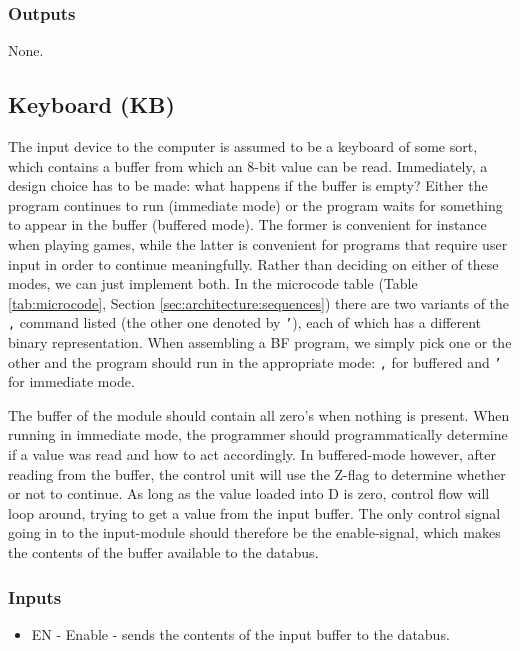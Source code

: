 \subsubsection*{Outputs}
None.


\subsection{Keyboard (KB)} \label{sec:architecture:kb}
The input device to the computer is assumed to be a keyboard of some sort, which contains a buffer from which an 8-bit value can be read. Immediately, a design choice has to be made: what happens if the buffer is empty? Either the program continues to run (immediate mode) or the program waits for something to appear in the buffer (buffered mode). The former is convenient for instance when playing games, while the latter is convenient for programs that require user input in order to continue meaningfully. Rather than deciding on either of these modes, we can just implement both. In the microcode table (Table \ref{tab:microcode}, Section \ref{sec:architecture:sequences}) there are two variants of the \texttt{,} command listed (the other one denoted by \texttt{'}), each of which has a different binary representation. When assembling a BF program, we simply pick one or the other and the program should run in the appropriate mode: \texttt{,} for buffered and \texttt{'} for immediate mode.

The buffer of the module should contain all zero's when nothing is present. When running in immediate mode, the programmer should programmatically determine if a value was read and how to act accordingly. In buffered-mode however, after reading from the buffer, the control unit will use the Z-flag to determine whether or not to continue. As long as the value loaded into D is zero, control flow will loop around, trying to get a value from the input buffer. The only control signal going in to the input-module should therefore be the enable-signal, which makes the contents of the buffer available to the databus.

\subsubsection*{Inputs}
\begin{itemize}
\itemsep0em 
\item EN - Enable - sends the contents of the input buffer to the databus.
\end{itemize}

